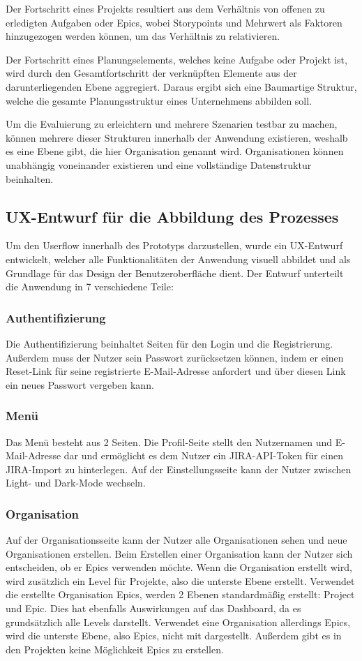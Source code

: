 Der Fortschritt eines Projekts resultiert aus dem Verhältnis von offenen zu erledigten Aufgaben oder Epics, wobei Storypoints und Mehrwert als Faktoren hinzugezogen werden können, um das Verhältnis zu relativieren.

Der Fortschritt eines Planungselements, welches keine Aufgabe oder Projekt ist, wird durch den Gesamtfortschritt der verknüpften Elemente aus der darunterliegenden Ebene aggregiert. Daraus ergibt sich eine Baumartige Struktur, welche die gesamte Planungsstruktur eines Unternehmens abbilden soll.

Um die Evaluierung zu erleichtern und mehrere Szenarien testbar zu machen, können mehrere dieser Strukturen innerhalb der Anwendung existieren, weshalb es eine Ebene gibt, die hier Organisation genannt wird. Organisationen können unabhängig voneinander existieren und eine vollständige Datenstruktur beinhalten.

\subsection{UX-Entwurf für die Abbildung des Prozesses}
Um den Userflow innerhalb des Prototyps darzustellen, wurde ein UX-Entwurf entwickelt, welcher alle Funktionalitäten der Anwendung visuell abbildet und als Grundlage für das Design der Benutzeroberfläche dient. Der Entwurf unterteilt die Anwendung in 7 verschiedene Teile:

\subsubsection{Authentifizierung}
Die Authentifizierung beinhaltet Seiten für den Login und die Registrierung. Außerdem muss der Nutzer sein Passwort zurücksetzen können, indem er einen Reset-Link für seine registrierte E-Mail-Adresse anfordert und über diesen Link ein neues Passwort vergeben kann.

\subsubsection{Menü}
Das Menü besteht aus 2 Seiten. Die Profil-Seite stellt den Nutzernamen und E-Mail-Adresse dar und ermöglicht es dem Nutzer ein JIRA-API-Token für einen JIRA-Import zu hinterlegen. Auf der Einstellungsseite kann der Nutzer zwischen Light- und Dark-Mode wechseln.

\subsubsection{Organisation}
Auf der Organisationsseite kann der Nutzer alle Organisationen sehen und neue Organisationen erstellen. Beim Erstellen einer Organisation kann der Nutzer sich entscheiden, ob er Epics verwenden möchte. Wenn die Organisation erstellt wird, wird zusätzlich ein Level für Projekte, also die unterste Ebene erstellt. Verwendet die erstellte Organisation Epics, werden 2 Ebenen standardmäßig erstellt: Project und Epic. Dies hat ebenfalls Auswirkungen auf das Dashboard, da es grundsätzlich alle Levels darstellt. Verwendet eine Organisation allerdings Epics, wird die unterste Ebene, also Epics, nicht mit dargestellt. Außerdem gibt es in den Projekten keine Möglichkeit Epics zu erstellen.

